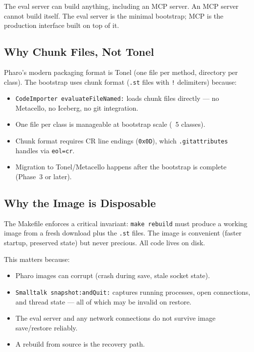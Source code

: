 \documentclass[a4paper,10pt,fleqn]{article}
\begin{document}
The eval server can build anything, including an MCP server.  An MCP
server cannot build itself.  The eval server is the minimal bootstrap;
MCP is the production interface built on top of it.

\subsection{Why Chunk Files, Not Tonel}

Pharo's modern packaging format is Tonel (one file per method, directory
per class).  The bootstrap uses chunk format (\texttt{.st} files with
\texttt{!} delimiters) because:

\begin{itemize}
  \item \texttt{CodeImporter evaluateFileNamed:} loads chunk files
    directly --- no Metacello, no Iceberg, no git integration.
  \item One file per class is manageable at bootstrap scale (~5 classes).
  \item Chunk format requires CR line endings (\texttt{0x0D}), which
    \texttt{.gitattributes} handles via \texttt{eol=cr}.
  \item Migration to Tonel/Metacello happens after the bootstrap is
    complete (Phase~3 or later).
\end{itemize}

\subsection{Why the Image is Disposable}

The Makefile enforces a critical invariant: \texttt{make rebuild} must
produce a working image from a fresh download plus the \texttt{.st}
files.  The image is convenient (faster startup, preserved state) but
never precious.  All code lives on disk.

This matters because:
\begin{itemize}
  \item Pharo images can corrupt (crash during save, stale socket state).
  \item \texttt{Smalltalk snapshot:andQuit:} captures running processes,
    open connections, and thread state --- all of which may be invalid
    on restore.
  \item The eval server and any network connections do not survive image
    save/restore reliably.
  \item A rebuild from source is the recovery path.
\end{itemize}
\end{document}
